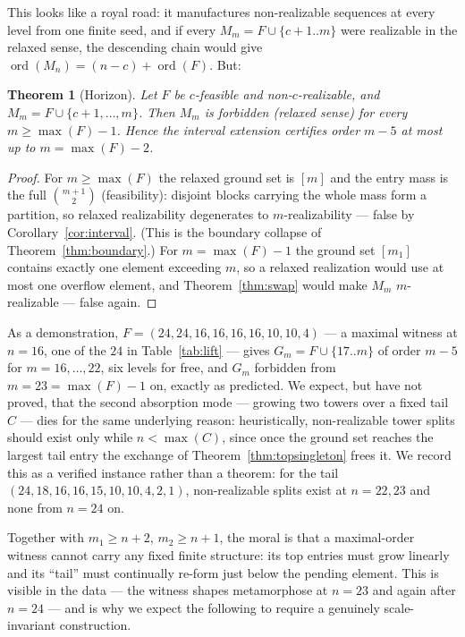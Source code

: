 \documentclass[11pt]{article}
\newtheorem{theorem}{Theorem}[section]
\theoremstyle{definition}
\theoremstyle{remark}
\newcommand{\ord}{\operatorname{ord}}
\newcommand{\intv}[1]{[#1]}
\begin{document}
This looks like a royal road: it manufactures non-realizable sequences at every
level from one finite seed, and if every $M_m=F\cup\{c+1..m\}$ were realizable in
the relaxed sense, the descending chain would give
$\ord(M_n)=(n-c)+\ord(F)$. But:

\begin{theorem}[Horizon]\label{thm:horizon}
Let $F$ be $c$-feasible and non-$c$-realizable, and $M_m=F\cup\{c+1,\dots,m\}$.
Then $M_m$ is forbidden (relaxed sense) for every $m\ge\max(F)-1$. Hence the
interval extension certifies order $m-5$ at most up to $m=\max(F)-2$.
\end{theorem}

\begin{proof}
For $m\ge\max(F)$ the relaxed ground set is $\intv m$ and the entry mass is the full
$\binom{m+1}{2}$ (feasibility): disjoint blocks carrying the whole mass form a
partition, so relaxed realizability degenerates to $m$-realizability --- false by
Corollary~\ref{cor:interval}. (This is the boundary collapse of
Theorem~\ref{thm:boundary}.) For $m=\max(F)-1$ the ground set $\intv{m_1}$ contains
exactly one element exceeding $m$, so a relaxed realization would use at most one
overflow element, and Theorem~\ref{thm:swap} would make $M_m$
$m$-realizable --- false again.
\end{proof}

As a demonstration, $F=(24,24,16,16,16,16,10,10,4)$ --- a maximal witness at
$n=16$, one of the $24$ in Table~\ref{tab:lift} --- gives $G_m=F\cup\{17..m\}$ of
order $m-5$ for $m=16,\dots,22$, six levels for free, and $G_m$ forbidden from
$m=23=\max(F)-1$ on, exactly as predicted. We expect, but have not proved, that the
second absorption mode --- growing two towers over a fixed tail $C$ --- dies for the
same underlying reason: heuristically, non-realizable tower splits should exist
only while $n<\max(C)$, since once the ground set reaches the largest tail entry
the exchange of Theorem~\ref{thm:topsingleton} frees it. We record this as a
verified instance rather than a theorem: for the tail
$(24,18,16,16,15,10,10,4,2,1)$, non-realizable splits exist at $n=22,23$ and none
from $n=24$ on.

Together with $m_1\ge n+2$, $m_2\ge n+1$, the moral is that a maximal-order witness
cannot carry any fixed finite structure: its top entries must grow linearly and its
``tail'' must continually re-form just below the pending element. This is visible
in the data --- the witness shapes metamorphose at $n=23$ and again after
$n=24$ --- and is why we expect the following to require a genuinely scale-invariant
construction.
\end{document}
